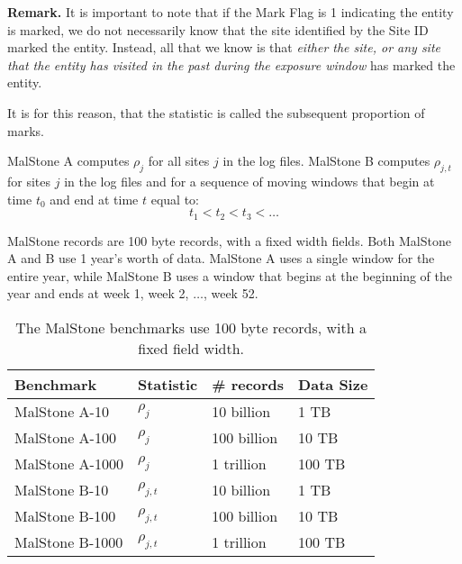 \documentclass{acm_proc_article-sp}
\def\malstone{MalStone } \def\malgen{MalGen }
\begin{document}
\medbreak
{\bf Remark.}  
It is important to note that if the Mark Flag is 1 indicating the entity is marked, we do not necessarily
know that the site identified by the Site ID marked the entity.  Instead, all that
we know is that {\em either the site, or any site that the entity has visited in the past
during the exposure window} has marked the entity.   

It is for this reason, that the statistic is called the subsequent proportion of marks.

\malstone A computes $\rho_j$ for all sites $j$ in the log files.  \malstone B computes
$\rho_{j,t}$ for sites $j$ in the log files and for a sequence of moving windows 
that begin at time $t_0$ and end at time $t$ equal to:
$$ t_1 < t_2 < t_3 < \ldots $$

MalStone records are 100 byte records, with a fixed width fields.
Both \malstone A and B use 1 year's worth of data.  \malstone A uses a
single window for the entire year, while \malstone B uses a window that
begins at the beginning of the year and ends at week 1, week 2, $\ldots$,
week 52.


\begin{table}
\begin{tabular}{|l|l|l|l|} \hline
{\bf Benchmark} & {\bf Statistic} & {\bf \#  records} & {\bf Data Size} \\ \hline
MalStone A-10 & $\rho_j$ & 10 billion & 1 TB \\ \hline
MalStone A-100 & $\rho_j$ & 100 billion & 10 TB \\ \hline
MalStone A-1000 & $\rho_j$ & 1 trillion & 100 TB \\ \hline
MalStone B-10 & $\rho_{j,t}$ & 10 billion & 1 TB \\ \hline
MalStone B-100 & $\rho_{j,t}$ & 100 billion & 10 TB \\ \hline
MalStone B-1000 & $\rho_{j,t}$ & 1 trillion & 100 TB \\ \hline
\end{tabular}
\caption{The MalStone benchmarks use 100 byte records, with a fixed
field width. }
\label{malstone-table}
\end{table}
\end{document}
